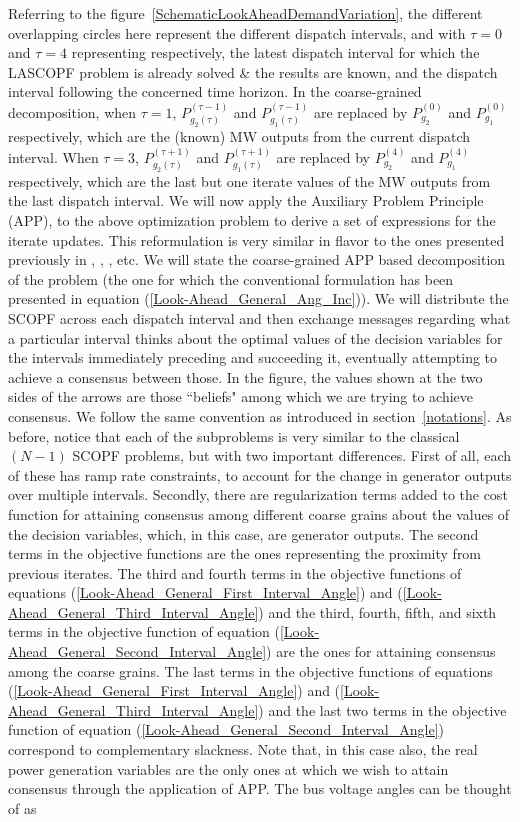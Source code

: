 \documentclass[preprint,12pt,3p]{elsarticle}
\begin{document}
Referring to the figure~\ref{SchematicLookAheadDemandVariation}, the different overlapping circles here represent the different dispatch intervals, and with $\tau=0$ and $\tau=4$ representing respectively, the latest dispatch interval for which the LASCOPF problem is already solved \& the results are known, and the dispatch interval following the concerned time horizon. In the coarse-grained decomposition, when $\tau = 1$, $P_{g_2(\tau)}^{(\tau-1)}$ and $P_{g_1(\tau)}^{(\tau-1)}$ are replaced by $P_{g_2}^{(0)}$ and $P_{g_1}^{(0)}$ respectively, which are the (known) MW outputs from the current dispatch interval. When $\tau = 3$, $P_{g_2(\tau)}^{(\tau+1)}$ and $P_{g_1(\tau)}^{(\tau+1)}$ are replaced by $P_{g_2}^{(4)}$ and $P_{g_1}^{(4)}$ respectively, which are the last but one iterate values of the MW outputs from the last dispatch interval. We will now apply the Auxiliary Problem Principle (APP)\cite{Cohen:78},  \cite{Cohen:80} to the above optimization problem to derive a set of expressions for the iterate updates. This reformulation is very similar in flavor to the ones presented previously in \cite{KB:97}, \cite{BKCL:99}, \cite{EbrBald:2000}, \cite{BatRen:92} etc. We will state the coarse-grained APP based decomposition of the problem (the one for which the conventional formulation has been presented in equation (\ref{Look-Ahead_General_Ang_Inc})). We will distribute the SCOPF across each dispatch interval and then exchange messages regarding what a particular interval thinks about the optimal values of the decision variables for the intervals immediately preceding and succeeding it, eventually attempting to achieve a consensus between those. In the figure, the values shown at the two sides of the arrows are those ``beliefs" among which we are trying to achieve consensus. We follow the same convention as introduced in section~\ref{notations}. As before, notice that each of the subproblems is very similar to the classical $(N-1)$ SCOPF problems, but with two important differences. First of all, each of these has ramp rate constraints, to account for the change in generator outputs over multiple intervals. Secondly, there are regularization terms added to the cost function for attaining consensus among different coarse grains about the values of the decision variables, which, in this case, are generator outputs. The second terms in the objective functions are the ones representing the proximity from previous iterates. The third and fourth terms in the objective functions of equations (\ref{Look-Ahead_General_First_Interval_Angle}) and (\ref{Look-Ahead_General_Third_Interval_Angle}) and the third, fourth, fifth, and sixth terms in the objective function of equation (\ref{Look-Ahead_General_Second_Interval_Angle}) are the ones for attaining consensus among the coarse grains. The last terms in the objective functions of equations (\ref{Look-Ahead_General_First_Interval_Angle}) and (\ref{Look-Ahead_General_Third_Interval_Angle}) and the last two terms in the objective function of equation (\ref{Look-Ahead_General_Second_Interval_Angle}) correspond to complementary slackness. Note that, in this case also, the real power generation variables are the only ones at which we wish to attain consensus through the application of APP. The bus voltage angles can be thought of as 
\end{document}
